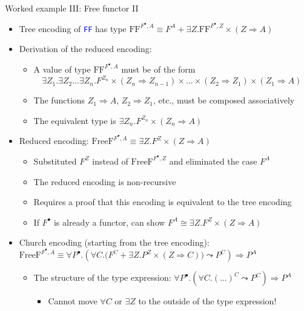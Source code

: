 \documentclass[english,,russian]{beamer}
\begin{document}
\begin{frame}{Worked example III: Free functor II}
\begin{itemize}
\item Tree encoding of \texttt{\textcolor{blue}{\footnotesize{}FF}} has
type $\text{FF}^{F^{\bullet},A}\equiv F^{A}+\exists Z.\text{FF}^{F^{\bullet},Z}\times\left(Z\Rightarrow A\right)$
\item Derivation of the reduced encoding:
\begin{itemize}
\item A value of type $\text{FF}^{F^{\bullet},A}$ must be of the form {\footnotesize{}
\[
\exists Z_{1}.\exists Z_{2}...\exists Z_{n}.F^{Z_{n}}\times\left(Z_{n}\Rightarrow Z_{n-1}\right)\times...\times\left(Z_{2}\Rightarrow Z_{1}\right)\times\left(Z_{1}\Rightarrow A\right)
\]
}{\footnotesize\par}
\item The functions $Z_{1}\Rightarrow A$, $Z_{2}\Rightarrow Z_{1}$, etc.,
must be composed associatively
\item The equivalent type is $\exists Z_{n}.F^{Z_{n}}\times\left(Z_{n}\Rightarrow A\right)$
\end{itemize}
\item Reduced encoding: $\text{FreeF}^{F^{\bullet},A}\equiv\exists Z.F^{Z}\times\left(Z\Rightarrow A\right)$
\begin{itemize}
\item Substituted $F^{Z}$ instead of $\text{FreeF}^{F^{\bullet},Z}$ and
eliminated the case $F^{A}$
\item The reduced encoding is non-recursive
\item Requires a proof that this encoding is equivalent to the tree encoding
\item If $F^{\bullet}$ is already a functor, can show $F^{A}\cong\exists Z.F^{Z}\times\left(Z\Rightarrow A\right)$
\end{itemize}
\item Church encoding (starting from the tree encoding): $\text{FreeF}^{F^{\bullet},A}\equiv\forall P^{\bullet}.\left(\forall C.\big(F^{C}+\exists Z.P^{Z}\times\left(Z\Rightarrow C\right)\big)\leadsto P^{C}\right)\Rightarrow P^{A}$
\begin{itemize}
\item The structure of the type expression: $\forall P^{\bullet}.\left(\forall C.(...)^{C}\leadsto P^{C}\right)\Rightarrow P^{A}$
\begin{itemize}
\item Cannot move $\forall C$ or $\exists Z$ to the outside of the type
expression!
\end{itemize}
\end{itemize}
\end{itemize}
\end{frame}
\end{document}
